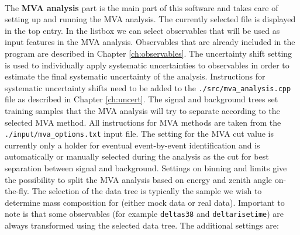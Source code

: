 \documentclass[12pt,a4paper]{report}
\begin{document}
\\
The \textbf{MVA analysis} part is the main part of this software and takes care of setting up and running the MVA analysis. The currently selected file is displayed in the top entry. In the listbox we can select observables that will be used as input features in the MVA analysis. Observables that are already included in the program are described in Chapter \ref{ch:observables}. The uncertainty shift setting is used to individually apply systematic uncertainties to observables in order to estimate the final systematic uncertainty of the analysis. Instructions for systematic uncertainty shifts need to be added to the \texttt{./src/mva\_analysis.cpp} file as described in Chapter \ref{ch:uncert}. The signal and background trees set training samples that the MVA analysis will try to separate according to the selected MVA method. All instructions for MVA methods are taken from the \texttt{./input/mva\_options.txt} input file. The setting for the MVA cut value is currently only a holder for eventual event-by-event identification and is automatically or manually selected during the analysis as the cut for best separation between signal and background. Settings on binning and limits give the possibility to split the MVA analysis based on energy and zenith angle on-the-fly. The selection of the data tree is typically the sample we wish to determine mass composition for (either mock data or real data). Important to note is that some observables (for example \texttt{deltas38} and \texttt{deltarisetime}) are always transformed using the selected data tree. The additional settings are:
\end{document}

